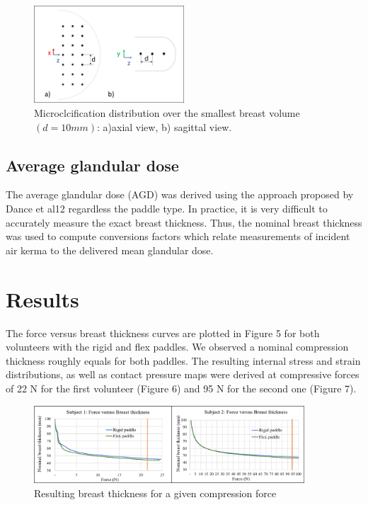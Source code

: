 \begin{figure}[!h]
\centering
\includegraphics[width=0.5\textwidth,keepaspectratio]{figures/microcalcifications.png} 
\caption{Microclcification distribution over the smallest breast volume $(d=10mm)$: a)axial view, b) sagittal view.}\label{fig:compressionpaddles}
\end{figure}

\subsection{ Average glandular dose}
The average glandular dose (AGD) was derived using the approach proposed by Dance et al12 regardless the paddle type.  In practice, it is very difficult to accurately measure the exact breast thickness. Thus, the nominal breast thickness was used to compute conversions factors which relate measurements of incident air kerma to the delivered mean glandular dose.

\section{Results}\label{section:breastcompressionevaluation}
The force versus breast thickness curves are plotted in Figure 5 for both volunteers with the rigid and flex paddles. We observed a nominal compression thickness roughly equals for both paddles. The resulting internal stress and strain distributions, as well as contact pressure maps were derived at compressive forces of 22 N for the first volunteer (Figure 6) and 95 N for the second one (Figure 7).

\begin{figure}[!h]
\centering
\includegraphics[width=0.9\textwidth,keepaspectratio]{figures/forceThicknessResults.png} 
\caption{Resulting breast thickness for a given compression force}\label{fig:forceThicknessResults}
\end{figure}

